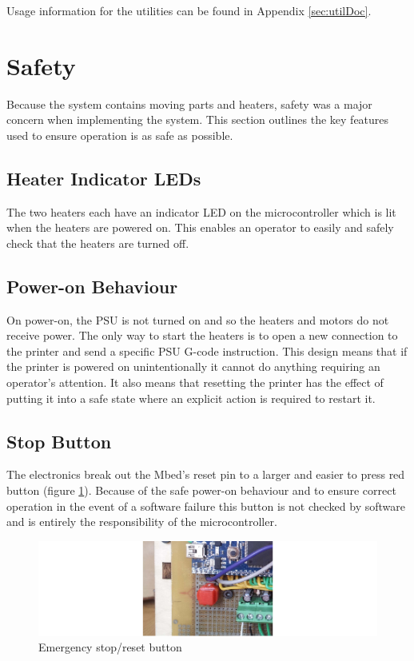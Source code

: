 		Usage information for the utilities can be found in Appendix
		\ref{sec:utilDoc}.
	
	\section{Safety}
		
		Because the system contains moving parts and heaters, safety was a major
		concern when implementing the system. This section outlines the key features
		used to ensure operation is as safe as possible.
		
		\subsection{Heater Indicator LEDs}
			
			The two heaters each have an indicator LED on the microcontroller which is
			lit when the heaters are powered on. This enables an operator to easily
			and safely check that the heaters are turned off.
		
		\subsection{Power-on Behaviour}
			
			On power-on, the PSU is not turned on and so the heaters and motors do not
			receive power. The only way to start the heaters is to open a new
			connection to the printer and send a specific PSU G-code instruction.
			This design means that if the printer is powered on unintentionally it
			cannot do anything requiring an operator's attention. It also means that
			resetting the printer has the effect of putting it into a safe state where
			an explicit action is required to restart it.
		
		\subsection{Stop Button}
			
			The electronics break out the Mbed's reset pin to a larger and easier to
			press red button (figure \ref{fig:stop}). Because of the safe power-on
			behaviour and to ensure correct operation in the event of a software
			failure this button is not checked by software and is entirely the
			responsibility of the microcontroller.
			
			\begin{figure}
				\includegraphics[width=1\textwidth]{diagrams/stop.pdf}
				\caption{Emergency stop/reset button}
				\label{fig:stop}
			\end{figure}
		
